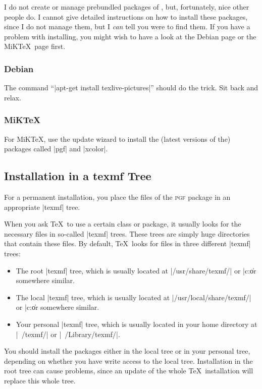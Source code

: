 I do not create or manage prebundled packages of \pgfname, but, fortunately,
nice other people do. I cannot give detailed instructions on how to install
these packages, since I do not manage them, but I \emph{can} tell you were to
find them. If you have a problem with installing, you might wish to have a look
at the Debian page or the MiK\TeX\ page first.


\subsubsection{Debian}

The command ``|apt-get install texlive-pictures|'' should do the trick.
Sit back and relax.


\subsubsection{MiKTeX}

For MiK\TeX, use the update wizard to install the (latest versions of the)
packages called |pgf| and |xcolor|.


\subsection{Installation in a texmf Tree}

For a permanent installation, you place the files of the \textsc{pgf} package
in an appropriate |texmf| tree.

When you ask \TeX\ to use a certain class or package, it usually looks for the
necessary files in so-called |texmf| trees. These trees are simply huge
directories that contain these files. By default, \TeX\ looks for files in
three different |texmf| trees:
%
\begin{itemize}
    \item The root |texmf| tree, which is usually located at
        |/usr/share/texmf/| or |c:\texmf\| or somewhere similar.
    \item The local  |texmf| tree, which is usually located at
        |/usr/local/share/texmf/| or |c:\localtexmf\| or somewhere similar.
    \item Your personal  |texmf| tree, which is usually located in your home
        directory at |~/texmf/| or |~/Library/texmf/|.
\end{itemize}

You should install the packages either in the local tree or in your personal
tree, depending on whether you have write access to the local tree.
Installation in the root tree can cause problems, since an update of the whole
\TeX\ installation will replace this whole tree.


